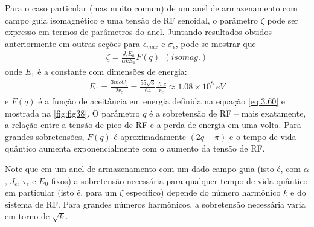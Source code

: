 Para o caso particular (mas muito comum) de um anel de armazenamento com campo guia isomagnético e uma tensão de RF senoidal, o parâmetro $\zeta$ pode ser expresso em termos de parâmetros do anel. Juntando resultados obtidos anteriormente em outras seções para $\epsilon_{max}$ e $\sigma_\epsilon$, pode-se mostrar que
\begin{align}
	\zeta = \frac{J_\epsilon E_0}{\alpha k E_1}F(q)\ \ (isomag.)
\end{align}
onde $E_1$ é a constante com dimensões de energia:
\begin{align}
	E_1 = \frac{3 mc C_q}{2r_e} = \frac{55\sqrt{3}}{64} \frac{\hslash c}{r_e} \approx 1.08 \times 10^8\ eV
\end{align}
e $F(q)$ é a função de aceitância em energia definida na equação \eqref{eq:3.60} e mostrada na \autoref{fig:fig38}. O parâmetro $q$ é a sobretensão de RF -- mais exatamente, a relação entre a tensão de pico de RF e a perda de energia em uma volta. Para grandes sobretensões, $F(q)$ é aproximadamente $(2q-\pi)$ e o tempo de vida quântico aumenta exponencialmente com o aumento da tensão de RF.

Note que em um anel de armazenamento com um dado campo guia (isto é, com $\alpha$, $J_\epsilon$, $\tau_\epsilon$ e $E_0$ fixos) a sobretensão necessária para qualquer tempo de vida quântico em particular (isto é, para um $\zeta$ específico) depende do número harmônico $k$ e do sistema de RF. Para grandes números harmônicos, a sobretensão necessária varia em torno de $\sqrt{k}$. 